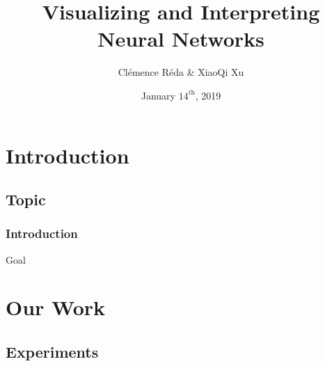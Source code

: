 \documentclass[10pt,frenchb]{beamer}
\author{Cl\'{e}mence R\'{e}da \& XiaoQi Xu}
\title[Visualizing and Interpreting]{Visualizing and Interpreting Neural Networks}
\date{January $14^{\text{th}}$, 2019}
\begin{document}
\maketitle


\section{Introduction}


\subsection{Topic}

\begin{frame}
\frametitle{Introduction}


\end{frame}

\begin{frame}{Goal}


\end{frame}

\begin{frame}
  \tableofcontents
\end{frame} 

\section{Our Work}

\subsection{Experiments}

\begin{frame}


\end{frame}

\begin{frame}


\end{frame}
\end{document}
